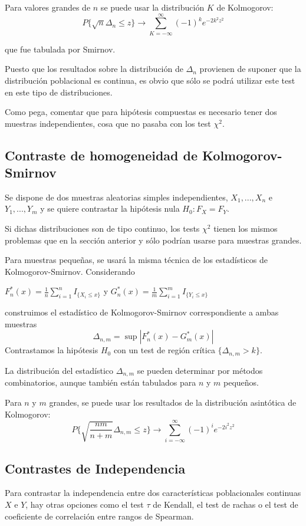 \documentclass[a4paper,12pt]{article}
\begin{document}
Para valores grandes de $n$ se puede usar la distribución $K$ de Kolmogorov:
$$P\{\sqrt{n}\Delta_n \leq z \} \longrightarrow \sum^{\infty}_{K=-\infty} (-1)^{k} e^{-2k^2 z^2}  $$

que fue tabulada por Smirnov.

Puesto que los resultados sobre la distribución de $\Delta_n$ provienen de suponer que la distribución poblacional es continua, es obvio que sólo se podrá utilizar este test en este tipo de distribuciones.

Como pega, comentar que para hipótesis compuestas es necesario tener dos muestras independientes, cosa que no pasaba con los test $\chi^2$.



\subsection{Contraste de homogeneidad de Kolmogorov-Smirnov}

Se dispone de dos muestras aleatorias simples independientes, $X_1,...,X_n $ e $Y_1,...,Y_m$ y se quiere contrastar la hipótesis nula $H_0:F_X = F_Y$.

Si dichas distribuciones son de tipo continuo, los tests $\chi^2$ tienen los mismos problemas que en la sección anterior y sólo podrían usarse para muestras grandes.

Para muestras pequeñas, se usará la misma técnica de los estadísticos de Kolmogorov-Smirnov. Considerando
\begin{center}
$F^*_n (x)=\frac{1}{n}\sum_{i=1}^n I_{\{X_i \leq x\}}$ y $G^*_n (x)=\frac{1}{m}\sum_{i=1}^m I_{\{Y_i \leq x\}}$
\end{center}
construimos el estadístico de Kolmogorov-Smirnov correspondiente a ambas muestras $$\Delta_{n,m}=\sup|F^*_n(x)-G^*_m (x)|$$
Contrastamos la hipótesis $H_0$ con un test de región crítica $\{ \Delta_{n,m} > k\}$.

La distribución del estadístico $\Delta_{n,m}$ se pueden determinar por métodos combinatorios, aunque también están tabulados para $n$ y $m$ pequeños.

Para $n$ y $m$ grandes, se puede usar los resultados de la distribución asintótica de Kolmogorov:
$$P\{ \sqrt{\frac{nm}{n+m}}\Delta_{n,m}\leq z\}\longrightarrow \sum^{\infty}_{i=-\infty}(-1)^i e^{-2i^2z^2}$$


\subsection{Contrastes de Independencia}
Para contrastar la independencia entre dos características poblacionales continuas $X$ e $Y$, hay otras opciones como el test $\tau$ de Kendall, el test de rachas o el test de coeficiente de correlación entre rangos de Spearman.
\end{document}
